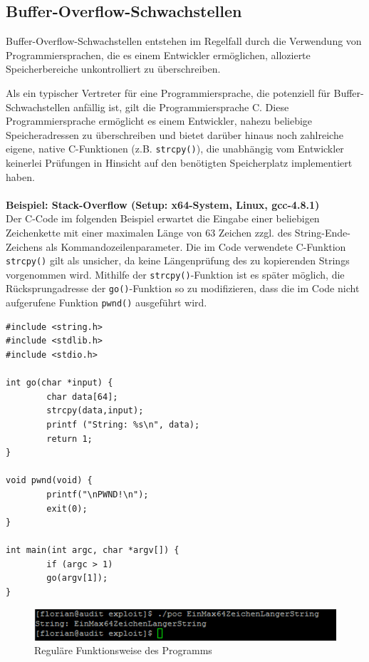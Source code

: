 \newpage
\subsection{Buffer-Overflow-Schwachstellen}	

Buffer-Overflow-Schwachstellen entstehen im Regelfall durch die 
Verwendung von Programmiersprachen, die es einem Entwickler ermöglichen, 
allozierte Speicherbereiche unkontrolliert zu überschreiben.

\par\medskip 
Als ein typischer Vertreter für eine Programmiersprache, die potenziell 
für Buffer-Schwachstellen anfällig ist, gilt die Programmiersprache C. 
Diese Programmiersprache ermöglicht es einem Entwickler, nahezu beliebige 
Speicheradressen zu überschreiben und bietet darüber hinaus noch 
zahlreiche eigene, native C-Funktionen (z.B. \texttt{strcpy()}), die 
unabhängig vom Entwickler keinerlei Prüfungen in Hinsicht auf den 
benötigten Speicherplatz implementiert haben.
\\\\
\textbf{Beispiel: Stack-Overflow (Setup: x64-System, Linux, gcc-4.8.1)}
\\
Der C-Code im folgenden Beispiel erwartet die Eingabe einer beliebigen 
Zeichenkette mit einer maximalen Länge von 63 Zeichen zzgl. 
des String-Ende-Zeichens als Kommandozeilenparameter. 
Die im Code verwendete C-Funktion \texttt{strcpy()} gilt als unsicher, 
da keine Längenprüfung des zu kopierenden Strings vorgenommen wird. 
Mithilfe der \texttt{strcpy()}-Funktion ist es später möglich, die 
Rücksprungadresse der \texttt{go()}-Funktion so zu modifizieren, dass 
die im Code nicht aufgerufene Funktion \texttt{pwnd()} ausgeführt wird.

\begin{lstlisting}[basicstyle=\ttfamily\footnotesize]
#include <string.h>
#include <stdlib.h>
#include <stdio.h>

int go(char *input) {
        char data[64];
        strcpy(data,input);
        printf ("String: %s\n", data);
        return 1;
}

void pwnd(void) {
        printf("\nPWND!\n");
        exit(0);
}

int main(int argc, char *argv[]) {
        if (argc > 1)
        go(argv[1]);
}
\end{lstlisting}

\begin{figure}[htbp]
 \centering
 \includegraphics[scale=.5]{abbildungen/poc_1}
 \caption{Reguläre Funktionsweise des Programms}
 \label{fig:poc_1} 
\end{figure}

